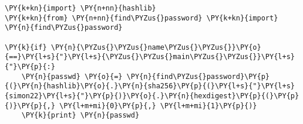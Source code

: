 \begin{Verbatim}[commandchars=\\\{\}]
\PY{k+kn}{import} \PY{n+nn}{hashlib}
\PY{k+kn}{from} \PY{n+nn}{find\PYZus{}password} \PY{k+kn}{import} \PY{n}{find\PYZus{}password}

\PY{k}{if} \PY{n}{\PYZus{}\PYZus{}name\PYZus{}\PYZus{}}\PY{o}{==}\PY{l+s}{"}\PY{l+s}{\PYZus{}\PYZus{}main\PYZus{}\PYZus{}}\PY{l+s}{"}\PY{p}{:}
	\PY{n}{passwd} \PY{o}{=} \PY{n}{find\PYZus{}password}\PY{p}{(}\PY{n}{hashlib}\PY{o}{.}\PY{n}{sha256}\PY{p}{(}\PY{l+s}{"}\PY{l+s}{simon22}\PY{l+s}{"}\PY{p}{)}\PY{o}{.}\PY{n}{hexdigest}\PY{p}{(}\PY{p}{)}\PY{p}{,} \PY{l+m+mi}{0}\PY{p}{,} \PY{l+m+mi}{1}\PY{p}{)}
	\PY{k}{print} \PY{n}{passwd}
\end{Verbatim}
